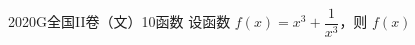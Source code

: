 
\begin{problem}{2020}{G}{全国II卷（文）}{10}{函数}
设函数 $ f(x)=x^3+\dfrac{1}{x^3} $，则 $ f(x) $
\begin{choices}
\end{choices}
\end{problem}

\begin{answer}

\end{answer}

\begin{solutions}

\end{solutions}